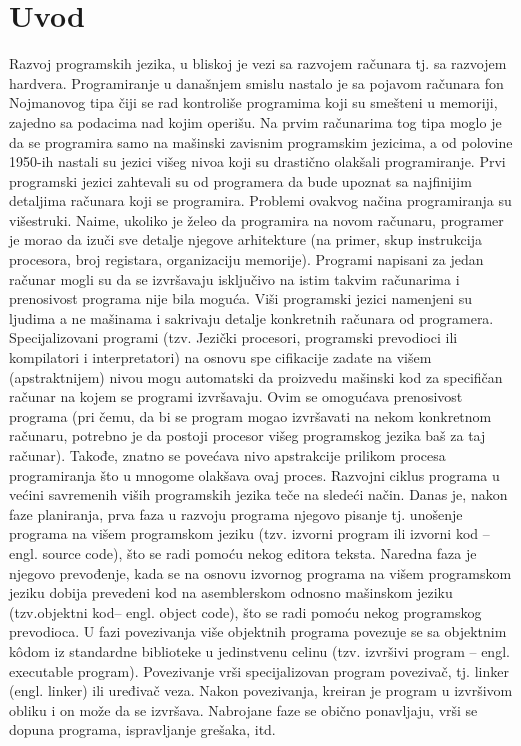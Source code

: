 \documentclass[a4paper]{article}
\begin{document}
\section{Uvod}
Razvoj programskih jezika, u bliskoj je vezi sa razvojem računara tj. sa razvojem hardvera. Programiranje u današnjem smislu nastalo je sa pojavom računara fon Nojmanovog tipa čiji se rad kontroliše programima koji su smešteni u memoriji, zajedno sa podacima nad kojim operišu. Na prvim računarima tog tipa moglo je da se programira samo na mašinski zavisnim programskim jezicima, a od polovine 1950-ih nastali su jezici višeg nivoa koji su drastično olakšali programiranje.
Prvi programski jezici zahtevali su od programera da bude upoznat sa najfinijim detaljima računara koji se programira. Problemi ovakvog načina programiranja su višestruki. Naime, ukoliko je želeo da programira na novom računaru, programer je morao da izuči sve detalje njegove arhitekture (na primer, skup instrukcija procesora, broj registara, organizaciju memorije). Programi napisani za jedan računar mogli su da se izvršavaju isključivo na istim takvim
računarima i prenosivost programa nije bila moguća.
Viši programski jezici namenjeni su ljudima a ne mašinama i sakrivaju detalje konkretnih računara od programera. Specijalizovani programi (tzv. Jezički procesori, programski prevodioci ili kompilatori i interpretatori) na osnovu spe
cifikacije zadate na višem (apstraktnijem) nivou mogu automatski da proizvedu
mašinski kod za specifičan računar na kojem se programi izvršavaju. Ovim se omogućava prenosivost programa (pri čemu, da bi se program mogao izvršavati na nekom konkretnom računaru, potrebno je da postoji procesor višeg programskog jezika baš za taj računar). Takođe, znatno se povećava nivo apstrakcije prilikom procesa programiranja što u mnogome olakšava ovaj proces.
Razvojni ciklus programa u većini savremenih viših programskih jezika teče
na sledeći način. Danas je, nakon faze planiranja, prva faza u razvoju programa njegovo pisanje tj. unošenje programa na višem programskom jeziku
(tzv. izvorni program ili izvorni kod – engl. source code), što se radi pomoću
nekog editora teksta. Naredna faza je njegovo prevođenje, kada se na osnovu
izvornog programa na višem programskom jeziku dobija prevedeni kod na asemblerskom odnosno mašinskom jeziku (tzv.objektni kod– engl. object code),
što se radi pomoću nekog programskog prevodioca. U fazi povezivanja više objektnih programa povezuje se sa objektnim kôdom iz standardne biblioteke u jedinstvenu celinu (tzv. izvršivi program – engl. executable program). Povezivanje vrši specijalizovan program povezivač, tj. linker
(engl. linker) ili uređivač veza. Nakon povezivanja, kreiran je program u izvršivom obliku i on može da se izvršava. Nabrojane faze se obično ponavljaju, vrši se dopuna programa, ispravljanje grešaka, itd.
\end{document}
